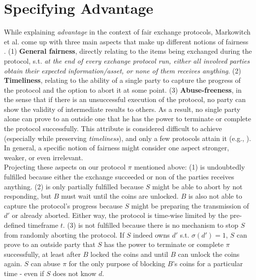 \documentclass{cacthesis}
\newcounter{protocol}
\begin{document}
        \section{Specifying Advantage}
        \label{sec:Advantage}
        While explaining \textit{advantage} in the context of fair exchange protocols, Markowitch et al. come up with three main aspects that make up different notions of fairness \cite{10.1007/3-540-36552-4_31}. (1) \textbf{General fairness}, directly relating to the items being exchanged during the protocol, s.t. \textit{at the end of every exchange protocol run, either all involved parties obtain their expected information/asset, or none of them receives anything}.  (2) \textbf{Timeliness}, relating to the ability of a single party to capture the progress of the protocol and the option to abort it at some point. (3) \textbf{Abuse-freeness}, in the sense that if there is an unsuccessful execution of the protocol, no party can show the validity of intermediate results to others. As a result, no single party alone can prove to an outside one that he has the power to terminate or complete the protocol successfully. This attribute is considered difficult to achieve (especially while preserving \textit{timeliness}), and only a few protocols attain it (e.g., \cite{Gao2008}). In general, a specific notion of fairness might consider one aspect stronger, weaker, or even irrelevant. \\
        Projecting these aspects on our protocol $\pi$ mentioned above: (1) is undoubtedly fulfilled because either the exchange succeeded or non of the parties receives anything. (2) is only partially fulfilled because $S$ might be able to abort by not responding, but $B$ must wait until the coins are unlocked. $B$ is also not able to capture the protocol's progress because $S$ might be preparing the transmission of $d'$ or already aborted. Either way, the protocol is time-wise limited by the pre-defined timeframe $t$. (3) is not fulfilled because there is no mechanism to stop $S$ from randomly aborting the protocol. If $S$ indeed owns $d'$ s.t. $\sigma\left( d'\right) =1$, $S$ can prove to an outside party that $S$ has the power to terminate or complete $\pi$ successfully, at least after $B$ locked the coins and until $B$ can unlock the coins again. $S$ can abuse $\pi$ for the only purpose of blocking $B$'s coins for a particular time - even if $S$ does not know $d$. 
        
\end{document}
